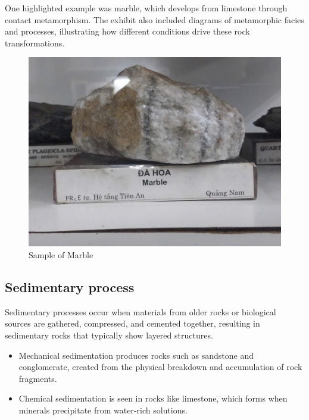 One highlighted example was marble, which develops from limestone through contact metamorphism. The exhibit also included diagrams of metamorphic facies and processes, illustrating how different conditions drive these rock transformations.

\begin{figure}[H]
  \centering
  \includegraphics[max width=0.8\linewidth]{graphics/figure_08.jpg}
  \caption{Sample of Marble}
  \label{fig:marble}
\end{figure}

\subsection{Sedimentary process}
\label{subsec:sedimentary-process}

Sedimentary processes occur when materials from older rocks or biological sources are gathered, compressed, and cemented together, resulting in sedimentary rocks that typically show layered structures.

\begin{itemize}
  \item Mechanical sedimentation produces rocks such as sandstone and conglomerate, created from the physical breakdown and accumulation of rock fragments.
  \item Chemical sedimentation is seen in rocks like limestone, which forms when minerals precipitate from water-rich solutions.
\end{itemize}

